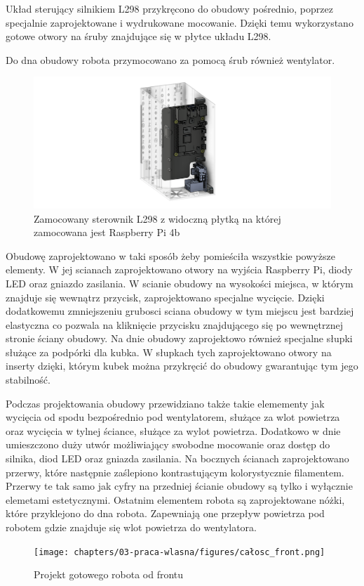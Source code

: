 Układ sterujący silnikiem L298 przykręcono do obudowy pośrednio, poprzez specjalnie zaprojektowane i wydrukowane mocowanie. Dzięki temu wykorzystano
gotowe otwory na śruby znajdujące się w płytce układu L298.

Do dna obudowy robota przymocowano za pomocą śrub również wentylator.

\begin{figure}[H]
    \centering
    \includegraphics[width=0.95\linewidth]{chapters/03-praca-wlasna/figures/l298n.png}
    \caption{\label{fig:steownik}Zamocowany sterownik L298 z widoczną płytką na której zamocowana jest Raspberry Pi 4b}
\end{figure}

Obudowę zaprojektowano w taki sposób żeby pomieściła wszystkie powyższe elementy. W jej scianach zaprojektowano otwory na wyjścia Raspberry Pi, 
diody LED oraz gniazdo zasilania. W scianie obudowy na wysokości miejsca, w którym znajduje się wewnątrz przycisk, zaprojektowano specjalne wycięcie.
Dzięki dodatkowemu zmniejszeniu grubosci sciana obudowy w tym miejscu jest bardziej elastyczna co pozwala na kliknięcie przycisku znajdującego
się po wewnętrznej stronie ściany obudowy. Na dnie obudowy zaprojektowo również specjalne słupki służące za podpórki dla kubka. 
W słupkach tych zaprojektowano otwory na inserty dzięki, którym kubek można przykręcić do obudowy gwarantując tym jego stabilność.

Podczas projektowania obudowy przewidziano także takie elemementy jak wycięcia od spodu bezpośrednio pod wentylatorem, służące za wlot powietrza 
oraz wycięcia w tylnej ściance, służące za wylot powietrza. Dodatkowo w dnie umieszczono duży utwór możliwiający swobodne mocowanie oraz dostęp do 
silnika, diod LED oraz gniazda zasilania. Na bocznych ścianach zaprojektowano przerwy, które następnie zaślepiono kontrastującym kolorystycznie filamentem.
Przerwy te tak samo jak cyfry na przedniej ścianie obudowy są tylko i wyłącznie elemetami estetycznymi. Ostatnim elementem robota są zaprojektowane nóżki, 
które przyklejono do dna robota. Zapewniają one przepływ powietrza pod robotem gdzie znajduje się wlot powietrza do wentylatora.

\begin{figure}[H]
    \centering
    \texttt{[image: chapters/03-praca-wlasna/figures/całosc\_front.png]}
    \caption{\label{fig:gotowy}Projekt gotowego robota od frontu}
\end{figure}